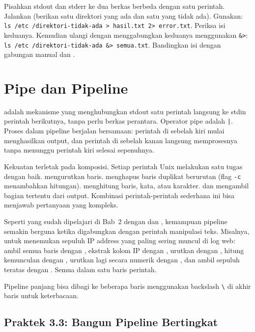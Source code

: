 \begin{challengebox}
Pisahkan stdout dan stderr ke dua berkas berbeda dengan satu perintah. Jalankan  (berikan satu direktori yang ada dan satu yang tidak ada). Gunakan: \texttt{ls /etc /direktori-tidak-ada > hasil.txt 2> error.txt}. Periksa isi keduanya. Kemudian ulangi dengan menggabungkan keduanya menggunakan \texttt{\&>}: \texttt{ls /etc /direktori-tidak-ada \&> semua.txt}. Bandingkan isi  dengan gabungan manual  dan .
\end{challengebox}

\section{Pipe dan Pipeline}
\label{sec:pipes}

 adalah mekanisme yang menghubungkan stdout satu perintah langsung ke stdin perintah berikutnya, tanpa perlu berkas perantara. Operator pipe adalah \texttt{|}. Proses dalam pipeline berjalan bersamaan: perintah di sebelah kiri mulai menghasilkan output, dan perintah di sebelah kanan langsung memprosesnya tanpa menunggu perintah kiri selesai sepenuhnya.

Kekuatan  terletak pada komposisi. Setiap perintah Unix melakukan satu tugas dengan baik.  mengurutkan baris.  menghapus baris duplikat berurutan (flag \texttt{-c} menambahkan hitungan).  menghitung baris, kata, atau karakter.  dan  mengambil bagian tertentu dari output. Kombinasi perintah-perintah sederhana ini bisa menjawab pertanyaan yang kompleks.

Seperti yang sudah dipelajari di Bab~2 dengan  dan , kemampuan pipeline semakin berguna ketika digabungkan dengan perintah manipulasi teks. Misalnya, untuk menemukan sepuluh IP address yang paling sering muncul di log web: ambil semua baris dengan , ekstrak kolom IP dengan , urutkan dengan , hitung kemunculan dengan , urutkan lagi secara numerik dengan , dan ambil sepuluh teratas dengan . Semua dalam satu baris perintah.

Pipeline panjang bisa dibagi ke beberapa baris menggunakan backslash \texttt{\textbackslash} di akhir baris untuk keterbacaan.

\subsection*{Praktek 3.3: Bangun Pipeline Bertingkat}

